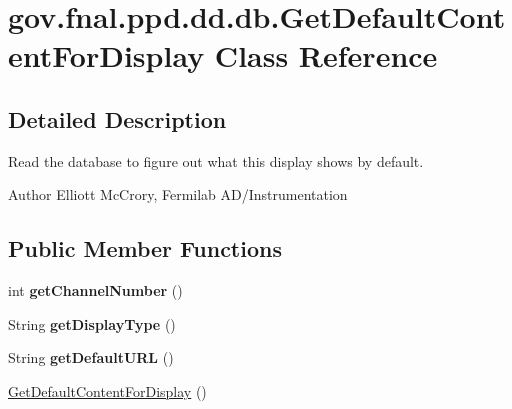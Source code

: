 \hypertarget{classgov_1_1fnal_1_1ppd_1_1dd_1_1db_1_1GetDefaultContentForDisplay}{\section{gov.\-fnal.\-ppd.\-dd.\-db.\-Get\-Default\-Content\-For\-Display Class Reference}
\label{classgov_1_1fnal_1_1ppd_1_1dd_1_1db_1_1GetDefaultContentForDisplay}
}


\subsection{Detailed Description}
Read the database to figure out what this display shows by default.

\begin{DoxyAuthor}{Author}
Elliott Mc\-Crory, Fermilab A\-D/\-Instrumentation 
\end{DoxyAuthor}
\subsection*{Public Member Functions}
\begin{DoxyCompactItemize}
\item 
\hypertarget{classgov_1_1fnal_1_1ppd_1_1dd_1_1db_1_1GetDefaultContentForDisplay_a91c8a3eed831fa3bb4ad275d69b4ba02}{int {\bfseries get\-Channel\-Number} ()}\label{classgov_1_1fnal_1_1ppd_1_1dd_1_1db_1_1GetDefaultContentForDisplay_a91c8a3eed831fa3bb4ad275d69b4ba02}

\item 
\hypertarget{classgov_1_1fnal_1_1ppd_1_1dd_1_1db_1_1GetDefaultContentForDisplay_a4a29571d02723ece4c261d02f49c6624}{String {\bfseries get\-Display\-Type} ()}\label{classgov_1_1fnal_1_1ppd_1_1dd_1_1db_1_1GetDefaultContentForDisplay_a4a29571d02723ece4c261d02f49c6624}

\item 
\hypertarget{classgov_1_1fnal_1_1ppd_1_1dd_1_1db_1_1GetDefaultContentForDisplay_a6bf210300f913dad893697e363b10943}{String {\bfseries get\-Default\-U\-R\-L} ()}\label{classgov_1_1fnal_1_1ppd_1_1dd_1_1db_1_1GetDefaultContentForDisplay_a6bf210300f913dad893697e363b10943}

\item 
\hyperlink{classgov_1_1fnal_1_1ppd_1_1dd_1_1db_1_1GetDefaultContentForDisplay_ac29f1d17bc0b8de2def1a7dfb77ee9c9}{Get\-Default\-Content\-For\-Display} ()
\end{DoxyCompactItemize}
